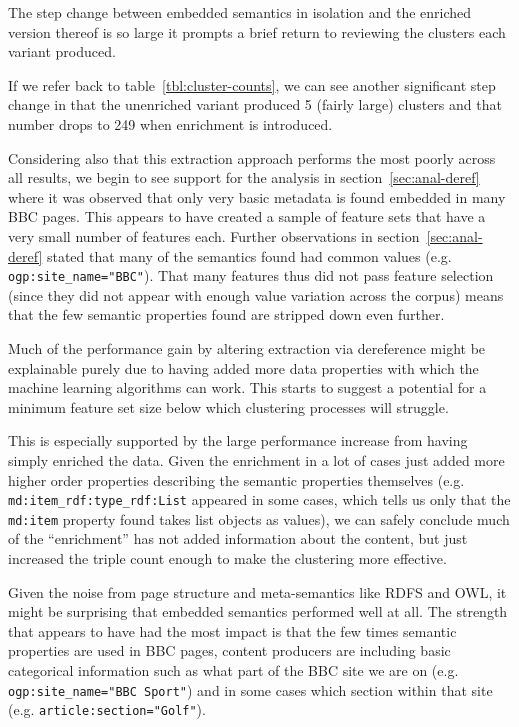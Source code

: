 The step change between embedded semantics in isolation and the
enriched version thereof is so large it prompts a brief return to
reviewing the clusters each variant produced.

If we refer back to table~\ref{tbl:cluster-counts}, we can see
another significant step change in that the unenriched variant
produced 5 (fairly large) clusters and that number drops to 249 when
enrichment is introduced.

Considering also that this extraction approach performs the most
poorly across all results, we begin to see support for the analysis
in section~\ref{sec:anal-deref} where it was observed that only very
basic metadata is found embedded in many BBC pages. This appears to
have created a sample of feature sets that have a very small number
of features each. Further observations in
section~\ref{sec:anal-deref} stated that
many of the semantics found had
common values (e.g. \texttt{ogp:site\_name="BBC"}). That many features
thus did not pass feature selection (since they did not appear
with enough value variation across the corpus) means that the few
semantic properties found are stripped down even further.

Much of the performance gain by altering extraction via dereference
might be explainable purely due to having added more data properties
with which the machine learning algorithms can work. This starts to
suggest a potential for a minimum feature set size below which
clustering processes will struggle.

This is especially supported by
the large performance increase from having simply enriched the data.
Given the enrichment in a lot of cases just added more higher order
properties describing the semantic properties themselves (e.g.
\texttt{md:item\_rdf:type\_rdf:List} appeared in some cases, which
tells us only that the \texttt{md:item} property found takes
list objects as values), we can safely conclude much of the
``enrichment'' has not added information about the content, but
just increased the triple count enough to make the clustering more
effective.

Given the noise from page structure and meta-semantics like RDFS and
OWL, it might be surprising that embedded semantics performed well
at all. The strength that appears to have had the most impact is that
the few times semantic properties are used in BBC pages, content
producers are including basic categorical information such as what
part of the BBC site we are on (e.g. \texttt{ogp:site\_name="BBC Sport"})
and in some cases which section within that site
(e.g. \texttt{article:section="Golf"}).

